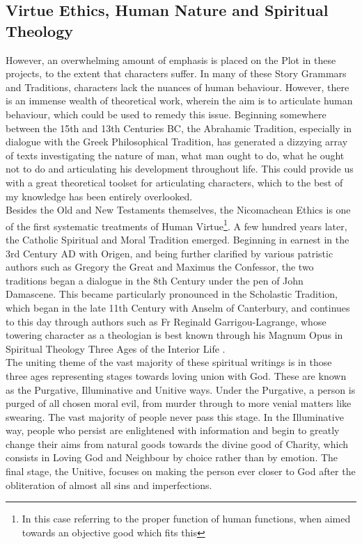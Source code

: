 \documentclass[12pt]{article}
\begin{document}
\subsection{Virtue Ethics, Human Nature and Spiritual Theology}
However, an overwhelming amount of emphasis is placed on the Plot in these projects, to the extent that characters suffer. In many of these Story Grammars and Traditions, characters lack the nuances of human behaviour. However, there is an immense wealth of theoretical work, wherein the aim is to articulate human behaviour, which could be used to remedy this issue. Beginning somewhere between the 15th and 13th Centuries BC, the Abrahamic Tradition, especially in dialogue with the Greek Philosophical Tradition, has generated a dizzying array of texts investigating the nature of man, what man ought to do, what he ought not to do and articulating his development throughout life. This could provide us with a great theoretical toolset for articulating characters, which to the best of my knowledge has been entirely overlooked. \\

Besides the Old and New Testaments themselves, the Nicomachean Ethics \cite{340BCEthicsAristotleNicomachean} is one of the first systematic treatments of Human Virtue\footnote{In this case referring to the proper function of human functions, when aimed towards an objective good which fits this}. A few hundred years later, the Catholic Spiritual and Moral Tradition emerged. Beginning in earnest in the 3rd Century AD with Origen\cite{bergsma2018catholic}, and being further clarified by various patristic authors such as Gregory the Great and Maximus the Confessor, the two traditions began a dialogue in the 8th Century under the pen of John Damascene. This became particularly pronounced in the Scholastic Tradition, which began in the late 11th Century with Anselm of Canterbury, and continues to this day through authors such as Fr Reginald Garrigou-Lagrange, whose towering character as a theologian is best known through his Magnum Opus in Spiritual Theology \: Three Ages of the Interior Life \cite{garrigou2013three}.\\

The uniting theme of the vast majority of these spiritual writings is in those three ages representing stages towards loving union with God. These are known as the Purgative, Illuminative and Unitive ways. Under the Purgative, a person is purged of all chosen moral evil, from murder through to more venial matters like swearing. The vast majority of people never pass this stage. In the Illuminative way, people who persist are enlightened with information and begin to greatly change their aims from natural goods towards the divine good of Charity, which consists in Loving God and Neighbour by choice rather than by emotion. The final stage, the Unitive, focuses on making the person ever closer to God after the obliteration of almost all sins and imperfections. \\ 
\end{document}
